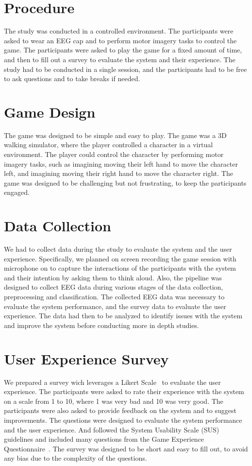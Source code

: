 \section{Procedure}
The study was conducted in a controlled environment.
The participants were asked to wear an EEG cap and to perform motor imagery tasks to control the game.
The participants were asked to play the game for a fixed amount of time, and then to fill out a survey to evaluate the system and their experience.
The study had to be conducted in a single session, and the participants had to be free to ask questions and to take breaks if needed.

\section{Game Design}
The game was designed to be simple and easy to play.
The game was a 3D walking simulator, where the player controlled a character in a virtual environment.
The player could control the character by performing motor imagery tasks, such as imagining moving their left hand to move the character left, and imagining moving their right hand to move the character right.
The game was designed to be challenging but not frustrating, to keep the participants engaged.

\section{Data Collection}
We had to collect data during the study to evaluate the system and the user experience.
Specifically, we planned on screen recording the game session with microphone on to capture the interactions of the participants with the system and their intention by asking them to think aloud.
Also, the pipeline was designed to collect EEG data during various stages of the data collection, preprocessing and classification.
The collected EEG data was necessary to evaluate the system performance, and the survey data to evaluate the user experience.
The data had then to be analyzed to identify issues with the system and improve the system before conducting more in depth studies.

\section{User Experience Survey}
We prepared a survey wich leverages a Likert Scale~\cite{likert1932technique} to evaluate the user experience.
The participants were asked to rate their experience with the system on a scale from 1 to 10, where 1 was very bad and 10 was very good.
The participants were also asked to provide feedback on the system and to suggest improvements.
The questions were designed to evaluate the system performance and the user experience.
And followed the System Usability Scale (SUS)~\cite{brooke1996sus} guidelines and included many questions from the Game Experience Questionnaire~\cite{ijsselsteijn2013game}.
The survey was designed to be short and easy to fill out, to avoid any bias due to the complexity of the questions.

